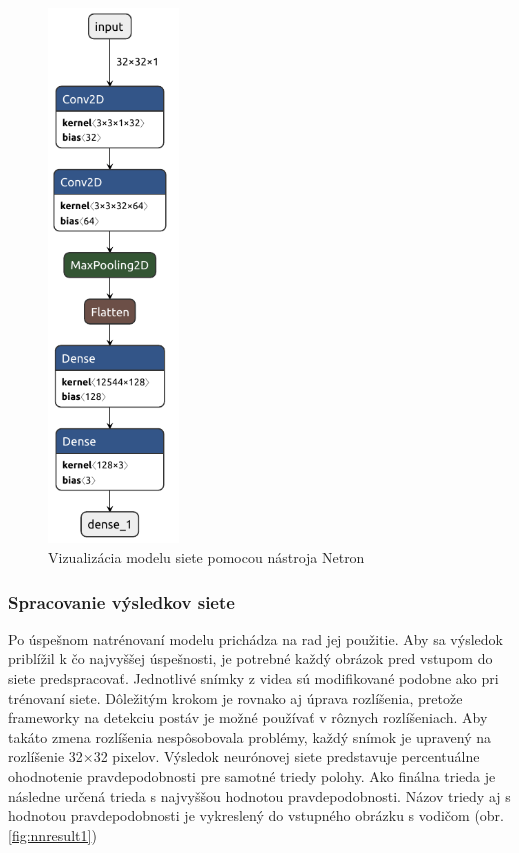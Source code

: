 \documentclass[slovak,master,dept460,male,cpp,cpdeclaration]{diploma}
\begin{document}
\begin{figure}[H]
	\centering
	\includegraphics[width=0.31\textwidth]{Figures/defaultModel.pdf}
	\caption{Vizualizácia modelu siete pomocou nástroja Netron\cite{netron}}
	\label{fig:modelNN}
\end{figure}

\newpage
\subsubsection*{Spracovanie výsledkov siete}
Po úspešnom natrénovaní modelu prichádza na rad jej použitie. Aby sa výsledok priblížil k čo najvyššej úspešnosti, je potrebné každý obrázok pred vstupom do siete predspracovať. Jednotlivé snímky z videa sú modifikované podobne ako pri trénovaní siete. Dôležitým krokom je rovnako aj úprava rozlíšenia, pretože frameworky na detekciu postáv  je možné používať v rôznych rozlíšeniach. Aby takáto zmena rozlíšenia nespôsobovala problémy, každý snímok je upravený na rozlíšenie 32$\times$32 pixelov. Výsledok neurónovej siete  predstavuje percentuálne ohodnotenie pravdepodobnosti pre  samotné triedy polohy. Ako finálna trieda je následne určená trieda s najvyššou hodnotou pravdepodobnosti. Názov triedy aj s hodnotou pravdepodobnosti je vykreslený do vstupného obrázku s vodičom (obr. \ref{fig:nnresult1})\par
\end{document}
